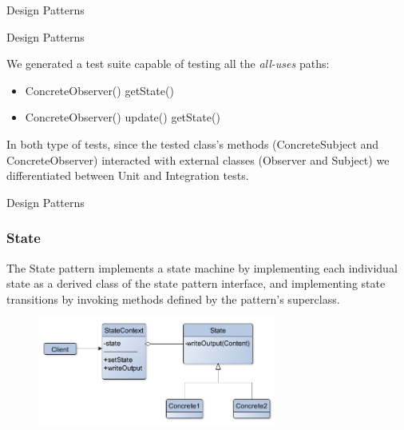 \documentclass{beamer}
\begin{document}
\begin{section}{Design Patterns}
\begin{subsection}{Design Patterns}
\begin{frame}
We generated a test suite capable of testing all the \textit{all-uses} paths:
\begin{itemize}
	\item ConcreteObserver() getState()
	\item ConcreteObserver() update() getState()
	
\end{itemize}
In both type of tests, since the tested class's methods (ConcreteSubject and ConcreteObserver) interacted with external classes (Observer and Subject) we  differentiated between Unit and Integration tests.		
	\end{frame}
\end{subsection}

\begin{subsection}{Design Patterns}
	\begin{frame}
		\frametitle{State}
		The State pattern implements a state machine by implementing each individual state as a derived class of the state pattern interface, and implementing state transitions by invoking methods defined by the pattern's superclass.
\begin{figure}[!h]
	\centering
	\includegraphics[width=0.7\textwidth]{./State/ClassDiagram.png}
	\label{SclassDiag}
\end{figure}
		
	\end{frame}
\end{subsection}


\end{section}
\end{document}
